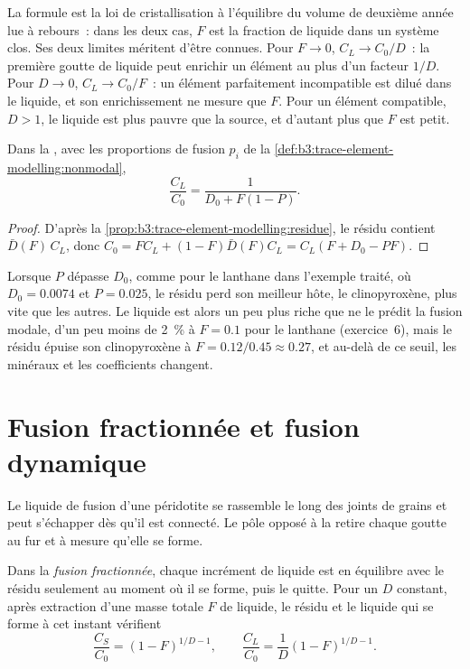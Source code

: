 La formule est la loi de cristallisation à l'équilibre du volume de deuxième année lue
à rebours~: dans les deux cas, $F$ est la fraction de liquide dans un système clos. Ses deux
limites méritent d'être connues. Pour $F \to 0$, $C_L \to C_0/D$~: la première goutte
de liquide peut enrichir un élément au plus d'un facteur $1/D$. Pour $D \to 0$, $C_L \to
C_0/F$~: un élément parfaitement incompatible est dilué dans le liquide, et son
enrichissement ne mesure que $F$. Pour un élément compatible, $D > 1$, le liquide est
plus pauvre que la source, et d'autant plus que $F$ est petit.

\begin{proposition}\label{prop:b3:trace-element-modelling:nonmodal}
Dans la , avec les proportions de fusion $p_i$ de la \cref{def:b3:trace-element-modelling:nonmodal},
\[
\frac{C_L}{C_0} = \frac{1}{D_0 + F(1 - P)}.
\]
\end{proposition}

\begin{proof}
D'après la \cref{prop:b3:trace-element-modelling:residue}, le résidu contient $\bar D(F)\,C_L$,
donc $C_0 = FC_L + (1 - F)\bar D(F)C_L = C_L(F + D_0 - PF)$.
\end{proof}

Lorsque $P$ dépasse $D_0$, comme pour le lanthane dans l'exemple traité, où $D_0 =
0.0074$ et $P = 0.025$, le résidu perd son meilleur hôte, le clinopyroxène, plus
vite que les autres. Le liquide est alors un peu plus riche que ne le prédit la fusion modale,
d'un peu moins de \qty{2}{\percent} à $F = 0.1$ pour le lanthane (exercice~6), mais le
résidu épuise son clinopyroxène à $F = 0.12/0.45 \approx 0.27$, et au-delà
de ce seuil, les minéraux et les coefficients changent.

\section{Fusion fractionnée et fusion dynamique}\label{sec:b3:trace-element-modelling:fractional}

Le liquide de fusion d'une péridotite se rassemble le long des joints de grains et peut
s'échapper dès qu'il est connecté. Le pôle opposé à la  retire chaque goutte
au fur et à mesure qu'elle se forme.

\begin{theorem}\label{thm:b3:trace-element-modelling:fractional}
Dans la \emph{fusion fractionnée}, chaque incrément de liquide
est en équilibre avec le résidu seulement au moment où il se forme, puis le
quitte. Pour un $D$ constant, après extraction d'une masse totale $F$ de liquide, le
résidu et le liquide qui se forme à cet instant vérifient
\[
\frac{C_S}{C_0} = (1 - F)^{1/D - 1}, \qquad
\frac{C_L}{C_0} = \frac{1}{D}(1 - F)^{1/D - 1}.
\]
\end{theorem}

